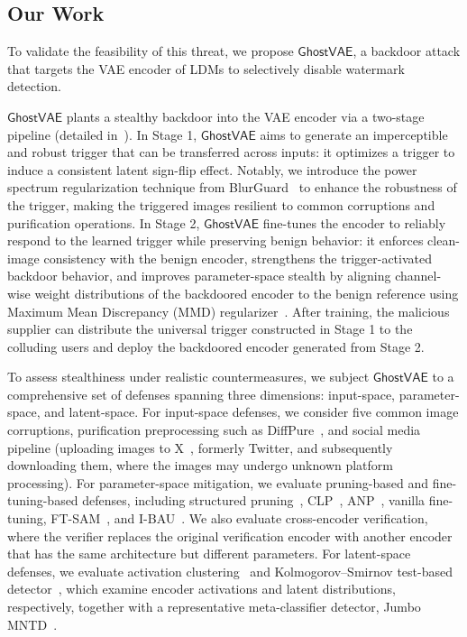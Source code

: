 \documentclass[letterpaper,twocolumn,10pt]{article}
\newcommand{\mg}{$\mathsf{GhostVAE}$\xspace}
\newcommand{\mypara}[1]{\smallskip\noindent{\bf {#1}.} \xspace}
\begin{document}
\subsection{Our Work}
To validate the feasibility of this threat, we propose \mg, a backdoor attack that targets the VAE encoder of LDMs to selectively disable watermark detection.

\mypara{Attack Framework}
\mg plants a stealthy backdoor into the VAE encoder via a two-stage pipeline (detailed in~).
In Stage 1, \mg aims to generate an imperceptible and robust trigger that can be transferred across inputs: it optimizes a trigger to induce a consistent latent sign-flip effect.
Notably, we introduce the power spectrum regularization technique from BlurGuard~\cite{kim2026blurguard} to enhance the robustness of the trigger, making the triggered images resilient to common corruptions and purification operations. 
In Stage 2, \mg fine-tunes the encoder to reliably respond to the learned trigger while preserving benign behavior: it enforces clean-image consistency with the benign encoder, strengthens the trigger-activated backdoor behavior, and improves parameter-space stealth by aligning channel-wise weight distributions of the backdoored encoder to the benign reference using Maximum Mean Discrepancy (MMD) regularizer~\cite{10.5555/2188385.2188410}. 
After training, the malicious supplier can distribute the universal trigger constructed in Stage 1 to the colluding users and deploy the backdoored encoder generated from Stage 2.

\mypara{Potential Defenses}
To assess stealthiness under realistic countermeasures, we subject \mg to a comprehensive set of defenses spanning three dimensions: input-space, parameter-space, and latent-space.
For input-space defenses, we consider five common image corruptions, purification preprocessing such as DiffPure~\cite{DBLP:conf/icml/NieGHXVA22}, and social media pipeline (uploading images to X~\cite{X}, formerly Twitter, and subsequently downloading them, where the images may undergo unknown platform processing).
For parameter-space mitigation, we evaluate pruning-based and fine-tuning-based defenses, including structured pruning~\cite{gu2017badnets}, CLP~\cite{DBLP:conf/eccv/ZhengTLL22}, ANP~\cite{DBLP:conf/iclr/ZengCPM0J22}, vanilla fine-tuning, FT-SAM~\cite{DBLP:conf/iccv/ZhuW0FW23}, and I-BAU~\cite{DBLP:conf/iclr/ZengCPM0J22}.
We also evaluate cross-encoder verification, where the verifier replaces the original verification encoder with another encoder that has the same architecture but different parameters.
For latent-space defenses, we evaluate activation clustering~\cite{DBLP:conf/aaai/ChenCBLELMS19} and Kolmogorov–Smirnov test-based detector~\cite{hodges1958smirnov}, which examine encoder activations and latent distributions, respectively, together with a representative meta-classifier detector, Jumbo MNTD~\cite{DBLP:conf/sp/XuWLBGL21}.
\end{document}
